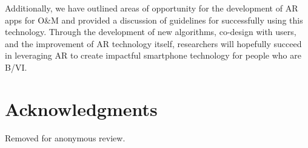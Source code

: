 \documentclass[chi_draft]{sigchi}
\newcommand{\BVI}{B/VI\xspace}
\newcommand{\OM}{O\&M\xspace}
\begin{document}
Additionally, we have outlined areas of opportunity for the development of AR apps for \OM and provided a discussion of guidelines for successfully using this technology.  Through the development of new algorithms, co-design with users, and the improvement of AR technology itself, researchers will hopefully succeed in leveraging AR to create impactful smartphone technology for people who are \BVI.  
%
\section{Acknowledgments}
Removed for anonymous review.

\balance{}



\end{document}
